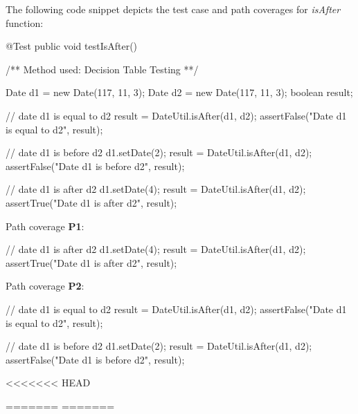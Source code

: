 \documentclass[fontsize=12pt,paper=letter,twoside]{scrartcl}
\begin{document}
\noindent The following code snippet depicts the test case and path coverages for \emph{isAfter} function:
\begin{code}
	@Test
	public void testIsAfter() {
		/** Method used: Decision Table Testing **/
		
		Date d1 = new Date(117, 11, 3);
		Date d2 = new Date(117, 11, 3);
		boolean result;
		
		// date d1 is equal to d2
		result = DateUtil.isAfter(d1, d2);
		assertFalse("Date d1 is equal to d2", result);
		
		// date d1 is before d2
		d1.setDate(2);
		result = DateUtil.isAfter(d1, d2);
		assertFalse("Date d1 is before d2", result);
		
		// date d1 is after d2
		d1.setDate(4);
		result = DateUtil.isAfter(d1, d2);
		assertTrue("Date d1 is after d2", result);
	}
\end{code}

\newpage
\noindent Path coverage \textbf{P1}:
\begin{code}
		// date d1 is after d2
		d1.setDate(4);
		result = DateUtil.isAfter(d1, d2);
		assertTrue("Date d1 is after d2", result);
\end{code}

\noindent Path coverage \textbf{P2}:
\begin{code}
		// date d1 is equal to d2
		result = DateUtil.isAfter(d1, d2);
		assertFalse("Date d1 is equal to d2", result);
		
		// date d1 is before d2
		d1.setDate(2);
		result = DateUtil.isAfter(d1, d2);
		assertFalse("Date d1 is before d2", result);
\end{code}

<<<<<<< HEAD

=======
=======
\end{document}
